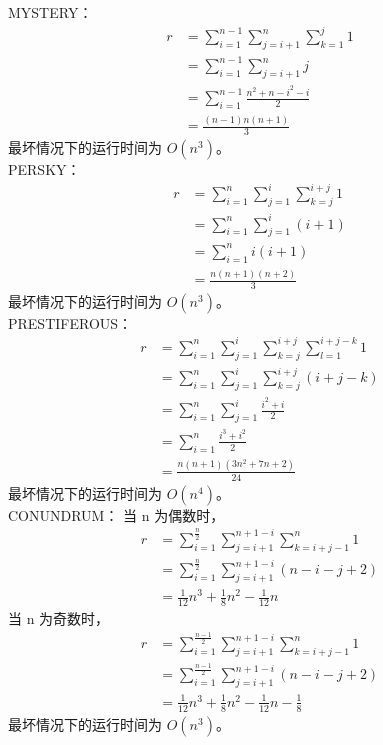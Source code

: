 \documentclass[12pt, a4paper, oneside]{ctexart}
\begin{document}
\newpage
\begin{solution}[2.24]
MYSTERY：
\begin{align*}
    r &= \sum_{i = 1}^{n - 1} \sum_{j = i + 1}^{n} \sum_{k = 1}^{j} 1 \\
    &= \sum_{i = 1}^{n - 1} \sum_{j = i + 1}^{n} j \\
    &= \sum_{i = 1}^{n - 1} \frac{n^2 + n - i^2 - i}{2} \\
    &= \frac{(n - 1)n(n + 1)}{3}
\end{align*}
最坏情况下的运行时间为 $O(n^3)$。
\\PERSKY：
\begin{align*}
    r &= \sum_{i = 1}^{n} \sum_{j = 1}^{i} \sum_{k = j}^{i + j} 1 \\
    &= \sum_{i = 1}^{n} \sum_{j = 1}^{i} (i + 1) \\
    &= \sum_{i = 1}^{n} i(i + 1) \\
    &= \frac{n(n + 1)(n + 2)}{3}
\end{align*}
最坏情况下的运行时间为 $O(n^3)$。
\\PRESTIFEROUS：
\begin{align*}
    r &= \sum_{i = 1}^{n} \sum_{j = 1}^{i} \sum_{k = j}^{i + j} \sum_{l = 1}^{i + j - k} 1 \\
    &= \sum_{i = 1}^{n} \sum_{j = 1}^{i} \sum_{k = j}^{i + j} (i + j - k) \\
    &= \sum_{i = 1}^{n} \sum_{j = 1}^{i} \frac{i^2 + i}{2} \\
    &= \sum_{i = 1}^{n} \frac{i^3 + i^2}{2} \\
    &= \frac{n(n + 1)(3n^2 + 7n + 2)}{24}
\end{align*}
最坏情况下的运行时间为 $O(n^4)$。
\\CONUNDRUM：
当 n 为偶数时，
\begin{align*}
    r &= \sum_{i = 1}^{\frac{n}{2}} \sum_{j = i + 1}^{n + 1 - i} \sum_{k = i + j - 1}^{n} 1 \\
    &= \sum_{i = 1}^{\frac{n}{2}} \sum_{j = i + 1}^{n + 1 - i} (n - i - j + 2) \\
    &= \frac{1}{12} n^3 + \frac{1}{8} n^2 - \frac{1}{12} n
\end{align*}
当 n 为奇数时，
\begin{align*}
    r &= \sum_{i = 1}^{\frac{n - 1}{2}} \sum_{j = i + 1}^{n + 1 - i} \sum_{k = i + j - 1}^{n} 1 \\
    &= \sum_{i = 1}^{\frac{n - 1}{2}} \sum_{j = i + 1}^{n + 1 - i} (n - i - j + 2) \\
    &= \frac{1}{12} n^3 + \frac{1}{8} n^2 - \frac{1}{12} n - \frac{1}{8}
\end{align*}
最坏情况下的运行时间为 $O(n^3)$。
\end{solution}
\end{document}
